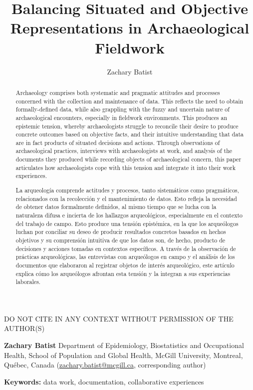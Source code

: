 \documentclass{article}
\begin{document}
\title{Balancing Situated and Objective Representations in Archaeological Fieldwork}
\author{Zachary Batist}
\date{}
\maketitle

\begin{center}
  DO NOT CITE IN ANY CONTEXT WITHOUT PERMISSION OF THE AUTHOR(S)
\end{center}

\noindent\textbf{Zachary Batist} Department of Epidemiology, Biostatistics and Occupational Health, School of Population and Global Health, McGill University, Montreal, Québec, Canada (\href{mailto:zachary.batist@mcgill.ca}{zachary.batist@mcgill.ca}, corresponding author)

\begin{abstract}\noindent
  Archaeology comprises both systematic and pragmatic attitudes and processes concerned with the collection and maintenance of data.
  This reflects the need to obtain formally-defined data, while also grappling with the fuzzy and uncertain nature of archaeological encounters, especially in fieldwork environments.
  This produces an epistemic tension, whereby archaeologists struggle to reconcile their desire to produce concrete outcomes based on objective facts, and their intuitive understanding that data are in fact products of situated decisions and actions.
  Through observations of archaeological practices, interviews with archaeologists at work, and analysis of the documents they produced while recording objects of archaeological concern, this paper articulates how archaeologists cope with this tension and integrate it into their work experiences.
\end{abstract}

\noindent
\textbf{Keywords:} {data work, documentation, collaborative experiences}\\

\begin{abstract}\noindent
  La arqueología comprende actitudes y procesos, tanto sistemáticos como pragmáticos, relacionados con la recolección y el mantenimiento de datos.
  Esto refleja la necesidad de obtener datos formalmente definidos, al mismo tiempo que se lucha con la naturaleza difusa e incierta de los hallazgos arqueológicos, especialmente en el contexto del trabajo de campo.
  Esto produce una tensión epistémica, en la que los arqueólogos luchan por conciliar su deseo de producir resultados concretos basados en hechos objetivos y su comprensión intuitiva de que los datos son, de hecho, producto de decisiones y acciones tomadas en contextos específicos.
  A través de la observación  de prácticas arqueológicas, las entrevistas con arqueólogos en campo y el análisis de los documentos que elaboraron al registrar objetos de interés arqueológico, este artículo explica cómo los arqueólogos afrontan esta tensión y la integran a sus experiencias laborales.
\end{abstract}
\end{document}
